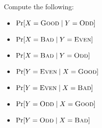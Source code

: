   Compute the following:
  \begin{itemize}
  \item $\Pr[X = \textsc{Good} \mid Y = \textsc{Odd}]$
  \item $\Pr[X = \textsc{Bad} \mid Y = \textsc{Even}]$
  \item $\Pr[X = \textsc{Bad} \mid Y = \textsc{Odd}]$
  \item $\Pr[Y = \textsc{Even} \mid X = \textsc{Good}]$
  \item $\Pr[Y = \textsc{Even} \mid X = \textsc{Bad}]$
  \item $\Pr[Y = \textsc{Odd} \mid X = \textsc{Good}]$
  \item $\Pr[Y = \textsc{Odd} \mid X = \textsc{Bad}]$
  \end{itemize}
